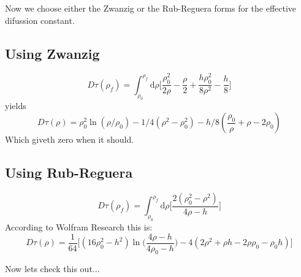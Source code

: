 \documentclass[letterpaperr,12pt]{article}
\newcommand{\rd}{\!\mathrm{d}}
\begin{document}
Now we choose either the Zwanzig or the Rub-Reguera forms for the 
effective difussion constant. 

\subsection{Using Zwanzig}

\begin{equation}
D \tau(\rho_f)= 
\int_{\rho_0}^{\rho_f} \rd \rho \biggl[ 
\frac{\rho_0^2}{2\rho}-\frac{\rho}{2}
+\frac{ h \rho_0^2}{8\rho^2}-\frac{h}{8}\biggr]
\end{equation}
yields
\begin{equation}
D \tau(\rho)=
\rho_0^2\ln(\rho/\rho_0)-1/4(\rho^2-\rho_0^2)
-h/8(\frac{\rho_0}{\rho}+\rho-2\rho_0)
\end{equation}
Which giveth zero when it should.

\subsection{Using Rub-Reguera}

\begin{equation}
D \tau(\rho_f)= 
\int_{\rho_0}^{\rho_f} \rd \rho \biggl[ 
\frac{2(\rho_0^2 -\rho^2)}{4\rho-h} \biggr]
\end{equation}
According to Wolfram Research this is:
\begin{equation}
D \tau(\rho)=
\frac{1}{64}\biggl[
(16\rho_0^2-h^2) \ln \biggl(\frac{4\rho-h}{4\rho_0-h}\biggr)
-4(2\rho^2+\rho h -2 \rho \rho_0 -\rho_0 h) 
\biggr]
\end{equation}

Now lets check this out...
\end{document}
